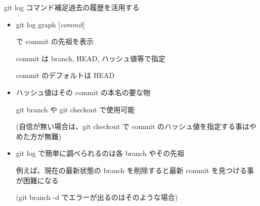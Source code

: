 \begin{frame}[t]{git log コマンド補足}{過去の履歴を活用する}

  \begin{itemize}
  \item git log {\dhyphen}graph [\textit{commit}]

    で commit の先祖を表示

    commit は branch, HEAD, ハッシュ値等で指定

    commit のデフォルトは HEAD
    \vspace{2ex}

  \item ハッシュ値はその commit の本名の要な物

    git branch や git checkout で使用可能

    (自信が無い場合は、git checkout で commit のハッシュ値を指定する事はやめた方が無難)
    \vspace{2ex}

  \item git log で簡単に調べられるのは各 branch やその先祖

    例えば、現在の最新状態の branch を削除すると最新 commit を見つける事が困難になる

    (git branch -d でエラーが出るのはそのような場合)
  \end{itemize}

\end{frame}
